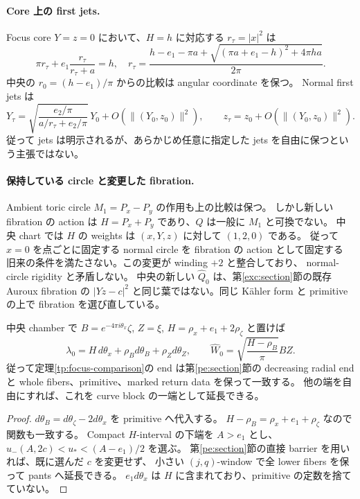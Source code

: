 \paragraph{Core 上の first jets.}
Focus core $Y=z=0$ において、$H=h$ に対応する $r_\tau=|x|^2$ は
\[
 \pi r_\tau+e_1\frac{r_\tau}{r_\tau+a}=h,
\quad
 r_\tau=\frac{h-e_1-\pi a+
    \sqrt{(\pi a+e_1-h)^2+4\pi ha}}{2\pi}.
\]
中央の $r_0=(h-e_1)/\pi$ からの比較は angular coordinate を保つ。
Normal first jets は
\[
 Y_\tau=\sqrt{\frac{e_2/\pi}{a/r_\tau+e_2/\pi}}\,Y_0+O(\|(Y_0,z_0)\|^2),
 \qquad z_\tau=z_0+O(\|(Y_0,z_0)\|^2).
\]
従って jets は明示されるが、あらかじめ任意に指定した jets を自由に保つという主張ではない。

\paragraph{保持している circle と変更した fibration.}
Ambient toric circle $M_1=P_x-P_y$ の作用も上の比較は保つ。
しかし新しい fibration の action は $H=P_x+P_y$ であり、$Q$ は一般に $M_1$ と可換でない。
中央 chart では $H$ の weights は $(x,Y,z)$ に対して $(1,2,0)$ である。
従って $x=0$ を点ごとに固定する normal circle を fibration の action として固定する
旧来の条件を満たさない。この変更が winding $+2$ と整合しており、
normal-circle rigidity と矛盾しない。
中央の新しい $\widehat Q_0$ は、第\ref{exc:section}節の既存 Auroux fibration の
$|Yz-c|^2$ と同じ葉ではない。同じ Kähler form と primitive の上で fibration を選び直している。

\begin{corollary}\label{tp:curve-end}
中央 chamber で $B=e^{-4\pi i\theta_x}\zeta$, $Z=\xi$,
$H=\rho_x+e_1+2\rho_\zeta$ と置けば
\[
 \lambda_0=H\,d\theta_x+\rho_Bd\theta_B+\rho_Zd\theta_Z,
 \qquad \widehat W_0=\sqrt{\frac{H-\rho_B}{\pi}}BZ.
\]
従って定理\ref{tp:focus-comparison}の end は第\ref{pe:section}節の decreasing radial end と
whole fibers、primitive、marked return data を保って一致する。
他の端を自由にすれば、これを curve block の一端として延長できる。
\end{corollary}
\begin{proof}
$d\theta_B=d\theta_\zeta-2d\theta_x$ を primitive へ代入する。
$H-\rho_B=\rho_x+e_1+\rho_\zeta$ なので関数も一致する。
Compact $H$-interval の下端を $A>e_1$ とし、
$u_-(A,2c)<u_*<(A-e_1)/2$ を選ぶ。
第\ref{pe:section}節の直接 barrier を用いれば、既に選んだ $c$ を変更せず、
小さい $(j,q)$-window で全 lower fibers を保って pants へ延長できる。
$e_1d\theta_x$ は $H$ に含まれており、primitive の定数を捨てていない。
\end{proof}

